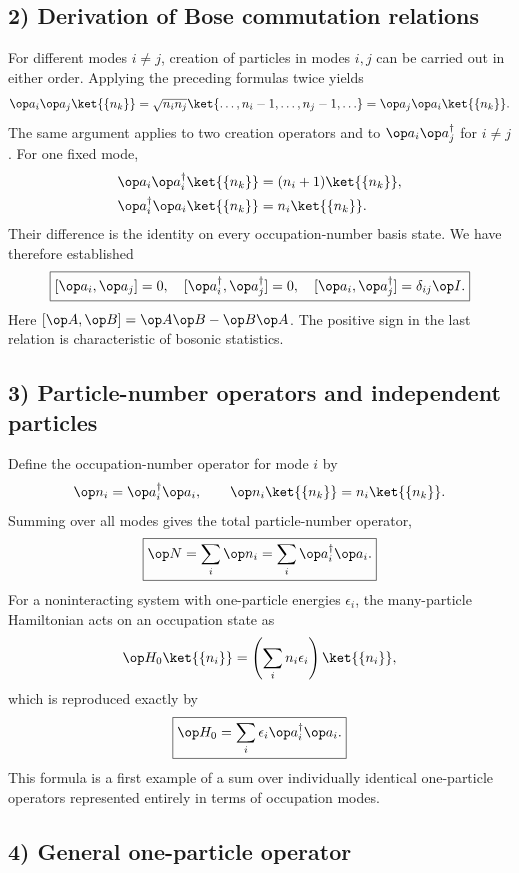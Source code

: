 \subsection*{2) Derivation of Bose commutation relations}

For different modes $i\ne j$, creation of particles in modes $i,j$ can be carried out in either order. Applying the preceding formulas twice yields
\[\op a_i\op a_j\ket{\{n_k\}}
  =\sqrt{n_i n_j}\ket{\ldots,n_i-1,\ldots,n_j-1,\ldots}
  =\op a_j\op a_i\ket{\{n_k\}}.\]
The same argument applies to two creation operators and to $\op a_i\op a_j^\dagger$ for $i\ne j$. For one fixed mode,
\[\begin{aligned}
\op a_i\op a_i^\dagger\ket{\{n_k\}}
 &=(n_i+1)\ket{\{n_k\}},\\
\op a_i^\dagger\op a_i\ket{\{n_k\}}
 &=n_i\ket{\{n_k\}}.
\end{aligned}\]
Their difference is the identity on every occupation-number basis state. We have therefore established
\[\boxed{[\op a_i,\op a_j]=0,\quad
[\op a_i^\dagger,\op a_j^\dagger]=0,\quad
[\op a_i,\op a_j^\dagger]=\delta_{ij}\op I.}\]
Here $[\op A,\op B]=\op A\op B-\op B\op A$. The positive sign in the last relation is characteristic of bosonic statistics.

\subsection*{3) Particle-number operators and independent particles}

Define the occupation-number operator for mode $i$ by
\[\op n_i=\op a_i^\dagger\op a_i,\qquad
\op n_i\ket{\{n_k\}}=n_i\ket{\{n_k\}}.\]
Summing over all modes gives the total particle-number operator,
\[\boxed{\op N=\sum_i\op n_i=\sum_i\op a_i^\dagger\op a_i.}\]
For a noninteracting system with one-particle energies $\epsilon_i$, the many-particle Hamiltonian acts on an occupation state as
\[\op H_0\ket{\{n_i\}}=\left(\sum_i n_i\epsilon_i\right)\ket{\{n_i\}},\]
which is reproduced exactly by
\[\boxed{\op H_0=\sum_i\epsilon_i\op a_i^\dagger\op a_i.}\]
This formula is a first example of a sum over individually identical one-particle operators represented entirely in terms of occupation modes.

\subsection*{4) General one-particle operator}


